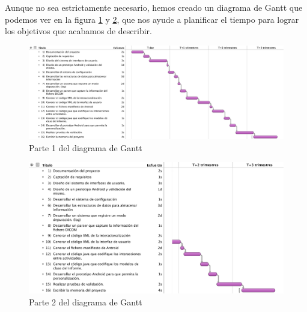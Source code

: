 Aunque no sea estrictamente necesario, hemos creado un diagrama de Gantt que podemos ver en la figura \ref{fig:gantt1} y \ref{fig:gantt2}, que nos ayude a planificar el tiempo para lograr los objetivos que acabamos de describir.\par
\begin{figure}[ht]
\hspace*{-0.5in}
\centering
\includegraphics[scale=0.5,  clip, trim=0cm 0cm 12cm 0cm]{./imgs/gantt.pdf}
\caption{Parte 1 del diagrama de Gantt}
\label{fig:gantt1}
\end{figure}
\begin{figure}[ht]
\centering
\hspace*{-1in}
\includegraphics[scale=0.6]{./imgs/planificacion/gantt2.png}
\caption{Parte 2 del diagrama de Gantt}
\label{fig:gantt2}
\end{figure}